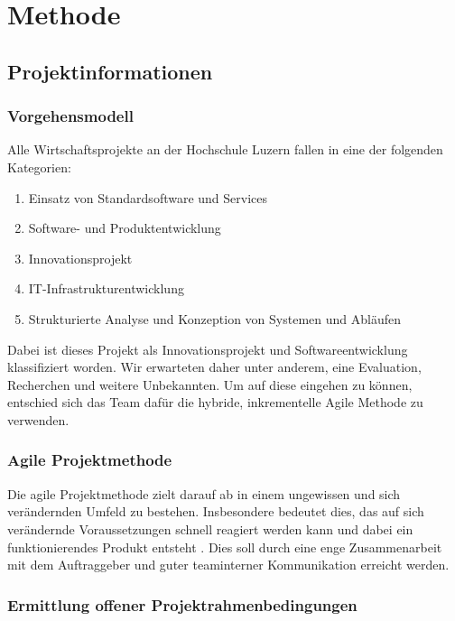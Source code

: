 \chapter{Methode}

\section{Projektinformationen}

\subsection{Vorgehensmodell}

Alle Wirtschaftsprojekte an der Hochschule Luzern fallen in eine der folgenden Kategorien:

\begin{enumerate}
	\item Einsatz von Standardsoftware und Services
	\item Software- und Produktentwicklung
	\item Innovationsprojekt
	\item IT-Infrastrukturentwicklung
	\item Strukturierte Analyse und Konzeption von Systemen und Abläufen
\end{enumerate}

Dabei ist dieses Projekt als Innovationsprojekt und Softwareentwicklung klassifiziert worden. Wir erwarteten daher unter anderem, eine Evaluation, Recherchen und weitere Unbekannten. Um auf diese eingehen zu können, entschied sich das Team dafür die hybride, inkrementelle Agile Methode zu verwenden.

\subsection{Agile Projektmethode}

Die agile Projektmethode zielt darauf ab in einem ungewissen und sich verändernden Umfeld zu bestehen. Insbesondere bedeutet dies, das auf sich verändernde Voraussetzungen schnell reagiert werden kann und dabei ein funktionierendes Produkt entsteht \parencite{AgileAlliance2015}. Dies soll durch eine enge Zusammenarbeit mit dem Auftraggeber und guter teaminterner Kommunikation erreicht werden.

\parencite{BaumannWicki2018}

\subsection{Ermittlung offener Projektrahmenbedingungen}
\label{ch:evaluation}

